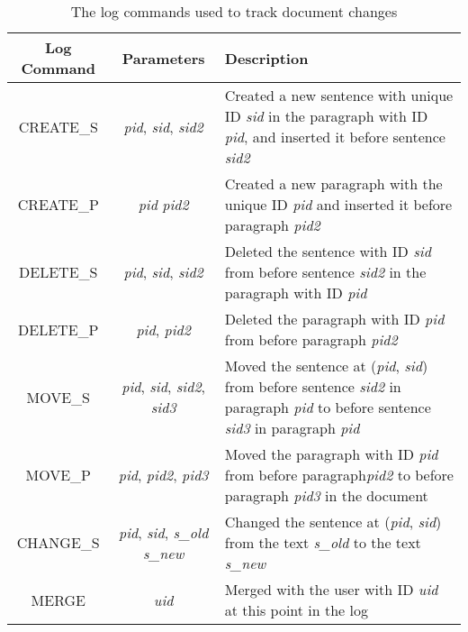\begin{table}[h!]
\begin{center}
 \begin{tabular} {|c|c|p{8cm}|}
  \hline
  Log Command & Parameters & Description \\
  \hline \hline
  CREATE\_S & \emph{pid}, \emph{sid}, \emph{sid2} & Created a new sentence with unique ID \emph{sid} in the paragraph with ID \emph{pid},
                                                    and inserted it before sentence \emph{sid2} \\
  \hline
  CREATE\_P & \emph{pid} \emph{pid2} & Created a new paragraph with the unique ID \emph{pid} and inserted it before paragraph \emph{pid2} \\
  \hline
  DELETE\_S & \emph{pid}, \emph{sid}, \emph{sid2} & Deleted the sentence with ID \emph{sid} from before sentence \emph{sid2} in the paragraph with ID \emph{pid} \\
  \hline
  DELETE\_P & \emph{pid}, \emph{pid2} & Deleted the paragraph with ID \emph{pid} from before paragraph \emph{pid2} \\
  \hline
  MOVE\_S & \emph{pid}, \emph{sid}, \emph{sid2}, \emph{sid3} & Moved the sentence at (\emph{pid}, \emph{sid}) 
                                                                         from before sentence \emph{sid2} in paragraph \emph{pid} 
                                                                         to before sentence \emph{sid3} in paragraph \emph{pid} \\
  \hline
  MOVE\_P & \emph{pid}, \emph{pid2}, \emph{pid3} & Moved the paragraph with ID \emph{pid} from before paragraph\emph{pid2} 
                                                                                          to before paragraph \emph{pid3} in the document \\ 
  \hline
  CHANGE\_S & \emph{pid}, \emph{sid}, \emph{s\_old} \emph{s\_new} & Changed the sentence at (\emph{pid}, \emph{sid}) from the text \emph{s\_old}
                                                              to the text \emph{s\_new}  \\
  \hline
  MERGE & \emph{uid} & Merged with the user with ID \emph{uid} at this point in the log \\
  \hline
 \end{tabular}
\end{center}
\caption{The log commands used to track document changes}
\label{table:log_commands}
\end{table}

